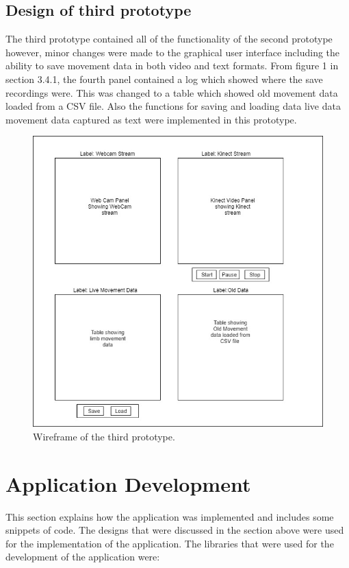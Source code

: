\documentclass[a4paper, 12pt]{article}
\begin{document}
\subsection{Design of third prototype}

The third prototype contained all of the functionality of the second prototype however, minor changes were made to the graphical user interface including the ability to save movement data in both video and text formats. From figure 1 in section 3.4.1, the fourth panel contained a log which showed where the save recordings were. This was changed to a table which showed old movement data loaded from a CSV file. Also the functions for saving and loading data live data movement data captured as text were implemented in this prototype.

\begin{figure}[!htb]
	\begin{center}
  \includegraphics[scale=0.7]{3PrototypeUI.jpg}
  	\caption{Wireframe of the third prototype.}
  \end{center} 
  \label{fig: 3rdPrototype} 
\end{figure}

\clearpage
\newpage 

\section{Application Development}
This section explains how the application was implemented and includes some snippets of code. The designs that were discussed in the section above were used for the implementation of the application. The libraries that were used for the development of the application were: 
\end{document}

